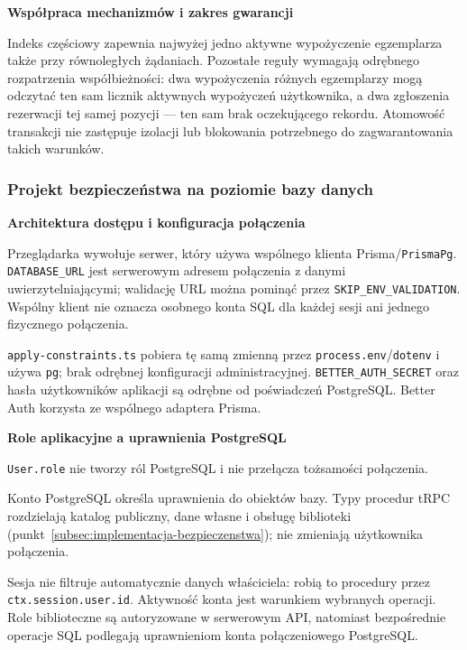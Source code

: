\documentclass[11pt, a4paper]{article}
\begin{document}
\noindent\textbf{Współpraca mechanizmów i zakres gwarancji}

Indeks częściowy zapewnia najwyżej jedno aktywne wypożyczenie egzemplarza także przy równoległych żądaniach. Pozostałe reguły wymagają odrębnego rozpatrzenia współbieżności: dwa wypożyczenia różnych egzemplarzy mogą odczytać ten sam licznik aktywnych wypożyczeń użytkownika, a dwa zgłoszenia rezerwacji tej samej pozycji --- ten sam brak oczekującego rekordu. Atomowość transakcji nie zastępuje izolacji lub blokowania potrzebnego do zagwarantowania takich warunków.

\subsubsection{Projekt bezpieczeństwa na poziomie bazy danych}
\label{subsec:bezpieczenstwo-bazy}

\noindent\textbf{Architektura dostępu i konfiguracja połączenia}

Przeglądarka wywołuje serwer, który używa wspólnego klienta Prisma/\texttt{PrismaPg}. \texttt{DATABASE\_URL} jest serwerowym adresem połączenia z danymi uwierzytelniającymi; walidację URL można pominąć przez \texttt{SKIP\_ENV\_VALIDATION}. Wspólny klient nie oznacza osobnego konta SQL dla każdej sesji ani jednego fizycznego połączenia.

\texttt{apply-constraints.ts} pobiera tę samą zmienną przez \texttt{process.env}/\texttt{dotenv} i używa \texttt{pg}; brak odrębnej konfiguracji administracyjnej. \texttt{BETTER\_AUTH\_SECRET} oraz hasła użytkowników aplikacji są odrębne od poświadczeń PostgreSQL. Better Auth korzysta ze wspólnego adaptera Prisma.

\noindent\textbf{Role aplikacyjne a uprawnienia PostgreSQL}

\texttt{User.role} nie tworzy ról PostgreSQL i nie przełącza tożsamości połączenia. 


Konto PostgreSQL określa uprawnienia do obiektów bazy. Typy procedur tRPC rozdzielają katalog publiczny, dane własne i obsługę biblioteki (punkt~\ref{subsec:implementacja-bezpieczenstwa}); nie zmieniają użytkownika połączenia.

Sesja nie filtruje automatycznie danych właściciela: robią to procedury przez \texttt{ctx.\allowbreak session.\allowbreak user.\allowbreak id}. Aktywność konta jest warunkiem wybranych operacji. Role biblioteczne są autoryzowane w serwerowym API, natomiast bezpośrednie operacje SQL podlegają uprawnieniom konta połączeniowego PostgreSQL.
\end{document}

